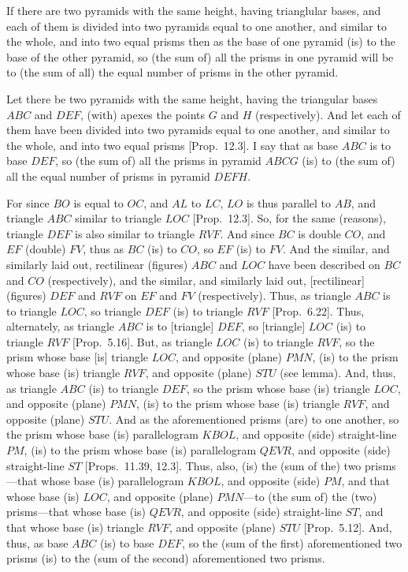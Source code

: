 If there are two pyramids with the same height, having trianglular
bases, and each of them is divided into two pyramids equal to one another, and
similar to the whole, and into two equal prisms then as the base of one pyramid
(is) to the base of the other pyramid, so  (the sum of) all the prisms in one pyramid
will be to (the sum of all) the equal  number of prisms in the other pyramid.

Let there be two pyramids with the same height, having the triangular
bases $ABC$ and $DEF$, (with)
apexes the points $G$ and $H$ (respectively). And let each of them have been divided into
two pyramids equal to one another, and similar to the whole, and into two
equal prisms [Prop.~12.3]. I say that as base $ABC$ is to base
$DEF$, so (the sum of) all the prisms in pyramid $ABCG$ (is) to (the sum of) all the equal number of prisms in
pyramid $DEFH$.

\centerline{}

For since $BO$ is equal to $OC$, and $AL$ to $LC$,
$LO$ is thus parallel to $AB$, and triangle $ABC$ similar to triangle $LOC$
[Prop.~12.3]. So, for the same (reasons), triangle $DEF$ is also similar
to triangle $RVF$. And since $BC$ is double $CO$, and $EF$ (double) $FV$, thus
as $BC$ (is) to $CO$, so $EF$ (is) to $FV$. And the similar, and similarly laid out, rectilinear
(figures) $ABC$ and $LOC$ have been described on $BC$ and $CO$ (respectively),
and the similar, and similarly laid out, [rectilinear] (figures) $DEF$ and $RVF$ on
$EF$ and $FV$ (respectively). Thus, as triangle $ABC$ is to triangle $LOC$, so triangle
$DEF$ (is) to triangle $RVF$ [Prop.~6.22]. Thus, alternately, as
triangle $ABC$ is to [triangle] $DEF$, so [triangle] $LOC$ (is) to triangle $RVF$ [Prop.~5.16]. But, as triangle $LOC$ (is) to triangle $RVF$, so the prism whose
base [is] triangle $LOC$, and opposite (plane) $PMN$, (is) to the prism whose base (is) triangle
$RVF$, and opposite (plane) $STU$ (see lemma). And, thus, as triangle $ABC$ (is) to triangle $DEF$,  so the prism whose base (is) triangle $LOC$, and opposite (plane) $PMN$, (is) to the
prism whose base (is) triangle $RVF$, and opposite (plane) $STU$. And as the aforementioned
prisms (are) to one another, so the prism whose base (is) parallelogram $KBOL$, and opposite
(side) straight-line $PM$, (is) to the prism whose
base (is) parallelogram $QEVR$, and opposite (side) straight-line $ST$ [Props.~11.39, 12.3]. Thus, also, (is) the (sum of the) two prisms---that whose base
(is) parallelogram $KBOL$, and opposite (side) $PM$, and that whose base (is) $LOC$,
and opposite (plane) $PMN$---to (the sum of) the  (two) prisms---that whose base (is) $QEVR$, and opposite
(side) straight-line $ST$, and that whose base (is) triangle $RVF$, and opposite (plane) $STU$
[Prop.~5.12]. And, thus, as base $ABC$ (is) to base $DEF$, so the 
(sum of the first) aforementioned two prisms (is) to the (sum  of the second) aforementioned two prisms.

